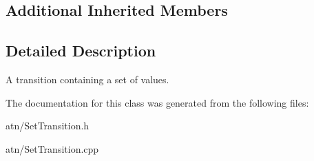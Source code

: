 \subsection*{Additional Inherited Members}


\subsection{Detailed Description}
A transition containing a set of values. 



The documentation for this class was generated from the following files\+:\begin{DoxyCompactItemize}
\item 
atn/Set\+Transition.\+h\item 
atn/Set\+Transition.\+cpp\end{DoxyCompactItemize}

